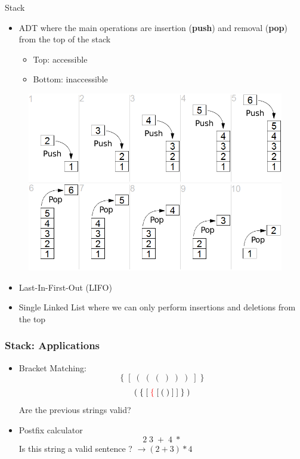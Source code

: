 \documentclass{beamer}
\begin{document}
\begin{frame}[fragile]{Stack}
    \begin{itemize}
		\item ADT where the main operations are insertion (\textbf{push}) and removal (\textbf{pop}) from the top of the stack
			\begin{itemize}
				\item Top: accessible
				\item Bottom: inaccessible
			\end{itemize}
	\end{itemize}
	
	\begin{figure}
		\centering
		\includegraphics[scale=0.2]{imgs/2-LDS/stack/stack.png}
	\end{figure}	
	
	\begin{itemize}
		\item Last-In-First-Out (LIFO)
		\item Single Linked List where we can only perform insertions and deletions from the top
	\end{itemize}
\end{frame}

\begin{frame}[fragile]
\frametitle{Stack: Applications}
	\begin{itemize}
		\item Bracket Matching:
			$$\{\;[\;(\;(\;(\;)\;)\;)\;]\;\}$$
			$$(\;\{\;[\color{red}\;\{\color{black}\;[\;(\;)\;]\;]\;\}\;)$$
			Are the previous strings valid?
		\item Postfix calculator
			$$2\;3 \;+ \;4 \;*$$
			Is this string a valid sentence ? $\rightarrow (2+3)*4$
	\end{itemize}
\end{frame}
\end{document}
